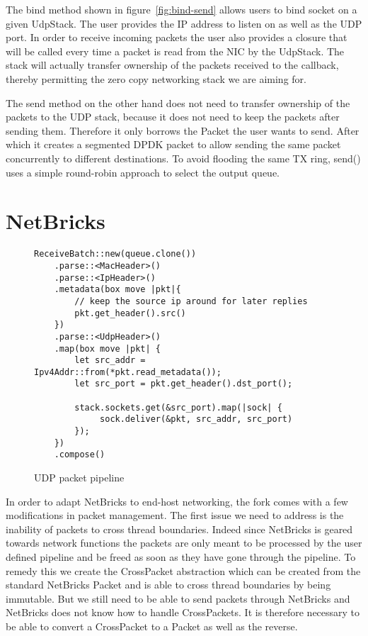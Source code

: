 

The bind method shown in figure~\ref{fig:bind-send} allows users to
bind socket on a given UdpStack. The user provides the IP address to
listen on as well as the UDP port. In order to receive incoming
packets the user also provides a closure that will be called every
time a packet is read from the NIC by the UdpStack. The stack will
actually transfer ownership of the packets received to the callback,
thereby permitting the zero copy networking stack we are aiming for.

The send method on the other hand does not need to transfer ownership
of the packets to the UDP stack, because it does not need to keep the
packets after sending them. Therefore it only borrows the Packet the
user wants to send. After which it creates a segmented DPDK packet to
allow sending the same packet concurrently to different destinations.
To avoid flooding the same TX ring, send() uses a simple round-robin
approach to select the output queue.


\section{NetBricks}

\begin{figure}[htb!]
\begin{lstlisting}
ReceiveBatch::new(queue.clone())
    .parse::<MacHeader>()
    .parse::<IpHeader>()
    .metadata(box move |pkt|{
        // keep the source ip around for later replies
        pkt.get_header().src()
    })
    .parse::<UdpHeader>()
    .map(box move |pkt| {
        let src_addr = Ipv4Addr::from(*pkt.read_metadata());
        let src_port = pkt.get_header().dst_port();

        stack.sockets.get(&src_port).map(|sock| {
             sock.deliver(&pkt, src_addr, src_port)
        });
    })
    .compose()
\end{lstlisting}

  \label{code:udp-pipeline}
  \caption{UDP packet pipeline}
\end{figure}

In order to adapt NetBricks to end-host networking, the fork comes
with a few modifications in packet management. The first issue we need
to address is the inability of packets to cross thread
boundaries. Indeed since NetBricks is geared towards network functions
the packets are only meant to be processed by the user defined
pipeline and be freed as soon as they have gone through the
pipeline. To remedy this we create the CrossPacket abstraction which
can be created from the standard NetBricks Packet and is able to cross
thread boundaries by being immutable. But we still need to be able to
send packets through NetBricks and NetBricks does not know how to
handle CrossPackets. It is therefore necessary to be able to convert a
CrossPacket to a Packet as well as the reverse.

